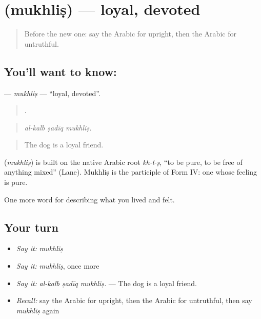 \section[\texorpdfstring{\ar{مخلص} (mukhliṣ)}{مخلص (mukhliṣ)}]{ (mukhliṣ) — loyal, devoted}

\label{lesson:AR-C499-mukhlis}



\begin{quote}
Before the new one: say the Arabic for upright, then the Arabic for untruthful.
\end{quote}

\subsection*{You'll want to know: }
\textbf{} — \emph{mukhliṣ} — \textquotedblleft{}loyal, devoted\textquotedblright{}.

\begin{quote}
  .
\end{quote}

\begin{quote}
\emph{al-kalb ṣadīq mukhliṣ.}
\end{quote}

\begin{quote}
The dog is a loyal friend.
\end{quote}

\begin{cousinweb}
\textbf{} (\emph{mukhliṣ}) is built on the native Arabic root \emph{kh-l-ṣ}, \textquotedblleft{}to be pure, to be free of anything mixed\textquotedblright{} (Lane). Mukhliṣ is the participle of Form IV: one whose feeling is pure.
\end{cousinweb}

\begin{grammarlens}[title={What you've built}]
One more word for describing what you lived and felt.
\end{grammarlens}

\subsection*{Your turn}
\begin{itemize}
\raggedright
  \item \emph{Say it:} \emph{mukhliṣ}
  \item \emph{Say it:} \emph{mukhliṣ}, once more
  \item \emph{Say it:} \emph{al-kalb ṣadīq mukhliṣ.} — The dog is a loyal friend.
  \item \emph{Recall:} say the Arabic for upright, then the Arabic for untruthful, then say \emph{mukhliṣ} again
\end{itemize}

